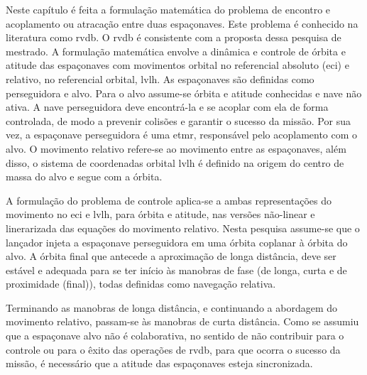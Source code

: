 \label{sec_introducao_formulacao_problema}

Neste capítulo é feita a formulação matemática do problema de encontro e acoplamento ou atracação entre duas espaçonaves.
Este problema é conhecido na literatura como \gls{rvdb}.
O \gls{rvdb} é consistente com a proposta dessa pesquisa de mestrado.
A formulação matemática envolve a dinâmica e controle de órbita e atitude das espaçonaves com movimentos orbital no referencial absoluto (\gls{eci}) e relativo, no referencial orbital, \gls{lvlh}.
As espaçonaves são definidas como perseguidora e alvo.
Para o alvo assume-se órbita e atitude conhecidas e nave não ativa.
A nave perseguidora deve encontrá-la e se acoplar com ela de forma controlada, de modo a prevenir colisões e garantir o sucesso da missão.
Por sua vez, a espaçonave perseguidora é uma \gls{etmr}, responsável pelo acoplamento com o alvo.
O movimento relativo refere-se ao movimento entre as espaçonaves, além disso, o sistema de coordenadas orbital \gls{lvlh} é definido na origem do centro de massa do alvo e segue com a órbita.

A formulação do problema de controle aplica-se a ambas representações do movimento no \gls{eci} e \gls{lvlh}, para órbita e atitude, nas versões não-linear e linerarizada das equações do movimento relativo.
Nesta pesquisa assume-se que o lançador injeta a espaçonave perseguidora em uma órbita coplanar à órbita do alvo.
A órbita final que antecede a aproximação de longa distância, deve ser estável e adequada para se ter início às manobras de fase (de longa, curta e de proximidade (final)), todas definidas como navegação relativa.

Terminando as manobras de longa distância, e continuando a abordagem do movimento relativo, passam-se às manobras de curta distância.
Como se assumiu que a espaçonave alvo não é colaborativa, no sentido de não contribuir para o controle ou para o êxito das operações de \gls{rvdb}, para que ocorra o sucesso da missão, é necessário que a atitude das espaçonaves esteja sincronizada.
